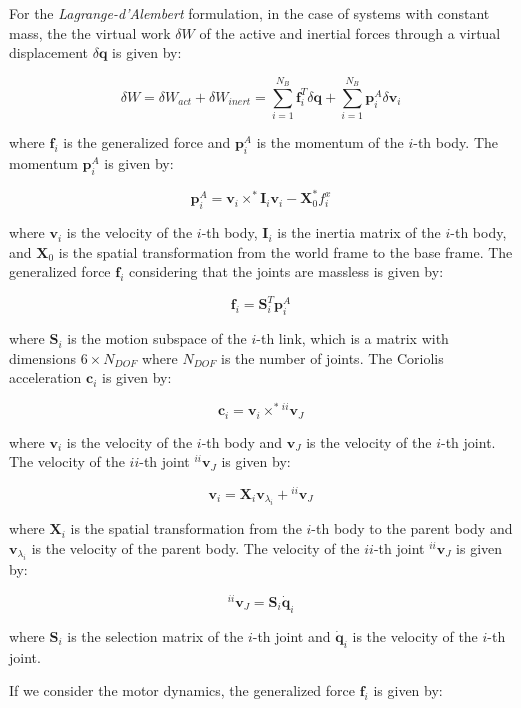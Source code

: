 For the \textit{Lagrange-d'Alembert} formulation, in the case of systems with constant mass, the the virtual work $\delta W$ of the active and inertial forces through a virtual displacement $\delta \mathbf{q}$ is given by:

$$
\delta W = \delta W _{act} + \delta W _{inert} = \sum _{i = 1} ^{N _B} \mathbf{f} _i ^T \delta \mathbf{q} + \sum _{i = 1} ^{N _B} \mathbf{p} ^A _i \delta \mathbf{v} _i
$$

where $\mathbf{f} _i$ is the generalized force and $\mathbf{p} ^A _i$ is the momentum of the $i$-th body. The momentum $\mathbf{p} ^A _i$ is given by:

$$
\mathbf{p} ^A _i = \mathbf{v} _i \times ^* \mathbf{I} _i \mathbf{v} _i - \mathbf{X} ^* _0 f ^x _i
$$

where $\mathbf{v} _i$ is the velocity of the $i$-th body, $\mathbf{I} _i$ is the inertia matrix of the $i$-th body, and $\mathbf{X} _0$ is the spatial transformation from the world frame to the base frame. The generalized force $\mathbf{f} _i$ considering that the joints are massless is given by:

$$
\mathbf{f} _i = \mathbf{S} ^T _i \mathbf{p} ^A _i
$$

where $\mathbf{S} _i$ is the motion subspace of the $i$-th link, which is a matrix with dimensions $6 \times N _{DOF}$ where $N _{DOF}$ is the number of joints. The Coriolis acceleration $\mathbf{c} _i$ is given by:

$$
\mathbf{c} _i = \mathbf{v} _i \times ^* {} ^{ii}\mathbf{v} _J
$$

where $\mathbf{v} _i$ is the velocity of the $i$-th body and $\mathbf{v} _J$ is the velocity of the $i$-th joint. The velocity of the $ii$-th joint ${} ^{ii}\mathbf{v} _J$ is given by:

$$
\mathbf{v} _i = \mathbf{X} _i \mathbf{v} _{\lambda _i} + {} ^{ii}\mathbf{v} _J
$$

where $\mathbf{X} _i$ is the spatial transformation from the $i$-th body to the parent body and $\mathbf{v} _{\lambda _i}$ is the velocity of the parent body. The velocity of the $ii$-th joint ${} ^{ii}\mathbf{v} _J$ is given by:

$$
{} ^{ii}\mathbf{v} _J = \mathbf{S} _i \dot{\mathbf{q}} _i
$$

where $\mathbf{S} _i$ is the selection matrix of the $i$-th joint and $\dot{\mathbf{q}} _i$ is the velocity of the $i$-th joint. 

If we consider the motor dynamics, the generalized force $\mathbf{f} _i$ is given by:

